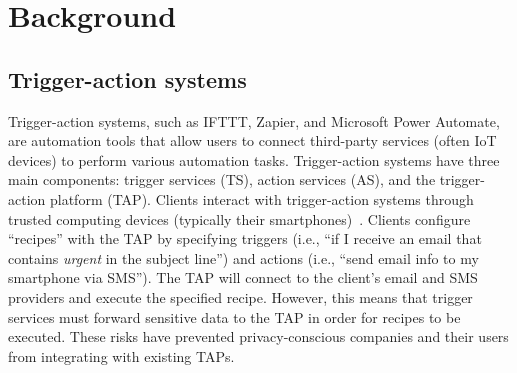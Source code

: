 \section{Background}
\label{sec:background}

\subsection{Trigger-action systems}

Trigger-action systems, such as IFTTT, Zapier, and Microsoft Power Automate, are
automation tools that allow users to connect third-party services (often IoT
devices) to perform various automation tasks. Trigger-action systems have three
main components: trigger services (TS), action services (AS), and the
trigger-action platform (TAP). Clients interact with trigger-action systems
through trusted computing devices (typically their
smartphones)~\cite{DBLP:conf/sp/ChenCWSCF21}. Clients configure ``recipes'' with
the TAP by specifying triggers (i.e., ``if I receive an email that contains
\emph{urgent} in the subject line'') and actions (i.e., ``send email info
to my smartphone via SMS''). The TAP will connect to the client's email and SMS
providers and execute the specified recipe. However, this means that trigger
services must forward sensitive data to the TAP in order for recipes to be
executed. These risks have prevented privacy-conscious companies and their users
from integrating with existing TAPs.




